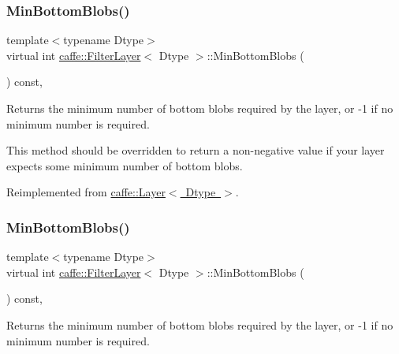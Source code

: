 \subsubsection{\texorpdfstring{Min\+Bottom\+Blobs()}{MinBottomBlobs()}\hspace{0.1cm}{\footnotesize\ttfamily [1/2]}}
{\footnotesize\ttfamily template$<$typename Dtype$>$ \\
virtual int \mbox{\hyperlink{classcaffe_1_1_filter_layer}{caffe\+::\+Filter\+Layer}}$<$ Dtype $>$\+::Min\+Bottom\+Blobs (\begin{DoxyParamCaption}{ }\end{DoxyParamCaption}) const\hspace{0.3cm}{\ttfamily [inline]}, {\ttfamily [virtual]}}



Returns the minimum number of bottom blobs required by the layer, or -\/1 if no minimum number is required. 

This method should be overridden to return a non-\/negative value if your layer expects some minimum number of bottom blobs. 

Reimplemented from \mbox{\hyperlink{classcaffe_1_1_layer_aca3cb2bafaefda5d4760aaebd0b72def}{caffe\+::\+Layer$<$ Dtype $>$}}.

\mbox{\label{classcaffe_1_1_filter_layer_af4c97961e859653ef0fa21d796af0259}} 
\subsubsection{\texorpdfstring{Min\+Bottom\+Blobs()}{MinBottomBlobs()}\hspace{0.1cm}{\footnotesize\ttfamily [2/2]}}
{\footnotesize\ttfamily template$<$typename Dtype$>$ \\
virtual int \mbox{\hyperlink{classcaffe_1_1_filter_layer}{caffe\+::\+Filter\+Layer}}$<$ Dtype $>$\+::Min\+Bottom\+Blobs (\begin{DoxyParamCaption}{ }\end{DoxyParamCaption}) const\hspace{0.3cm}{\ttfamily [inline]}, {\ttfamily [virtual]}}



Returns the minimum number of bottom blobs required by the layer, or -\/1 if no minimum number is required. 

